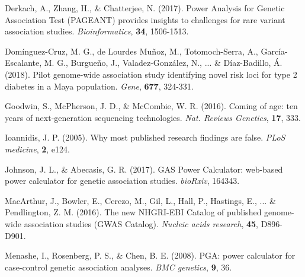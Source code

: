 \documentclass{bioinfo}
\begin{document}
\begin{thebibliography}{}

Derkach, A., Zhang, H., \& Chatterjee, N. (2017). 
Power Analysis for Genetic Association Test (PAGEANT) provides insights to challenges for rare variant association studies. 
{\it Bioinformatics}, {\bf 34}, 1506-1513.


Dom\'inguez-Cruz, M. G., de Lourdes Mu\~noz, M., Totomoch-Serra, A., Garc\'ia-Escalante, M. G., Burgue\~no, J., Valadez-Gonz\'alez, N., ... \& D\'iaz-Badillo, \'A. (2018). 
Pilot genome-wide association study identifying novel risk loci for type 2 diabetes in a Maya population. 
{\it Gene}, {\bf 677}, 324-331.

Goodwin, S., McPherson, J. D., \& McCombie, W. R. (2016). 
Coming of age: ten years of next-generation sequencing technologies. 
{\it Nat. Reviews Genetics}, {\bf 17}, 333.

Ioannidis, J. P. (2005).
Why most published research findings are false. 
{\it PLoS medicine}, {\bf 2}, e124.

Johnson, J. L., \& Abecasis, G. R. (2017). 
GAS Power Calculator: web-based power calculator for genetic association studies. 
{\it bioRxiv}, 164343.


MacArthur, J., Bowler, E., Cerezo, M., Gil, L., Hall, P., Hastings, E., ... \& Pendlington, Z. M. (2016). 
The new NHGRI-EBI Catalog of published genome-wide association studies (GWAS Catalog). 
{\it Nucleic acids research}, {\bf 45}, D896-D901.

Menashe, I., Rosenberg, P. S., \& Chen, B. E. (2008). 
PGA: power calculator for case-control genetic association analyses. 
{\it BMC genetics}, {\bf 9}, 36.


\end{thebibliography}
\end{document}
